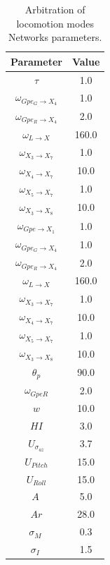 \documentclass[preprint,12pt]{elsarticle}
\begin{document}
\begin{table}[t]
\centering
\caption{Arbitration of locomotion modes Networks parameters.}
\begin{tabular}{|c|c|}
\hline
\textbf{Parameter} & \textbf{Value} \\ \hline
$\tau$ & 1.0 \\ \hline

$\omega_{Gpe_G \rightarrow X_4}$ & 1.0 \\ \hline
$\omega_{Gpe_R \rightarrow X_4}$ & 2.0 \\ \hline

$\omega_{L \rightarrow X}$ & 160.0 \\ \hline

$\omega_{X_3 \rightarrow X_7}$ & 1.0 \\ \hline
$\omega_{X_4 \rightarrow X_7}$ & 10.0 \\ \hline
$\omega_{X_5 \rightarrow X_7}$ & 1.0 \\ \hline

$\omega_{X_3 \rightarrow X_8}$ & 10.0 \\ \hline
$\omega_{Gpe \rightarrow X_1}$ & 1.0 \\ \hline

$\omega_{Gpe_G \rightarrow X_4}$ & 1.0 \\ \hline
$\omega_{Gpe_R \rightarrow X_4}$ & 2.0 \\ \hline

$\omega_{L \rightarrow X}$ & 160.0 \\ \hline



$\omega_{X_3 \rightarrow X_7}$ & 1.0 \\ \hline
$\omega_{X_4 \rightarrow X_7}$ & 10.0 \\ \hline
$\omega_{X_5 \rightarrow X_7}$ & 1.0 \\ \hline

$\omega_{X_3 \rightarrow X_8}$ & 10.0 \\ \hline

$\theta_{p}$ & 90.0 \\ \hline

$\omega_{GpeR}$ & 2.0 \\ \hline
$w$ & 10.0 \\ \hline

$HI$ & 3.0 \\ \hline

$U_{\sigma_{az}}$ & 3.7 \\ \hline
$U_{Pitch}$ & 15.0 \\ \hline
$U_{Roll}$ & 15.0 \\ \hline
$A\ $ & 5.0 \\ \hline
$ Ar $ & 28.0 \\ \hline
$\sigma_{M}\ $ & 0.3 \\ \hline
$\sigma_{I}\ $ & 1.5 \\ \hline
\end{tabular}
\label{table:Locom_NN}
\end{table}
\end{document}
